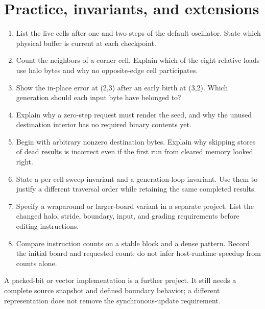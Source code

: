 \section{Practice, invariants, and
  extensions}\label{008-life-generations-x-practice-practice-invariants-and-extensions}

\begin{enumerate}
  \def\labelenumi{\arabic{enumi}.}
  \tightlist
  \item
        List the live cells after one and two steps of the default oscillator.
        State which physical buffer is current at each checkpoint.
  \item
        Count the neighbors of a corner cell. Explain which of the eight
        relative loads use halo bytes and why no opposite-edge cell
        participates.
  \item
        Show the in-place error at (2,3) after an early birth at (3,2). Which
        generation should each input byte have belonged to?
  \item
        Explain why a zero-step request must render the seed, and why the
        unused destination interior has no required binary contents yet.
  \item
        Begin with arbitrary nonzero destination bytes. Explain why skipping
        stores of dead results is incorrect even if the first run from cleared
        memory looked right.
  \item
        State a per-cell sweep invariant and a generation-loop invariant. Use
        them to justify a different traversal order while retaining the same
        completed results.
  \item
        Specify a wraparound or larger-board variant in a separate project.
        List the changed halo, stride, boundary, input, and grading
        requirements before editing instructions.
  \item
        Compare instruction counts on a stable block and a dense pattern.
        Record the initial board and requested count; do not infer
        host-runtime speedup from counts alone.
\end{enumerate}

A packed-bit or vector implementation is a further project. It still
needs a complete source snapshot and defined boundary behavior; a
different representation does not remove the synchronous-update
requirement.

